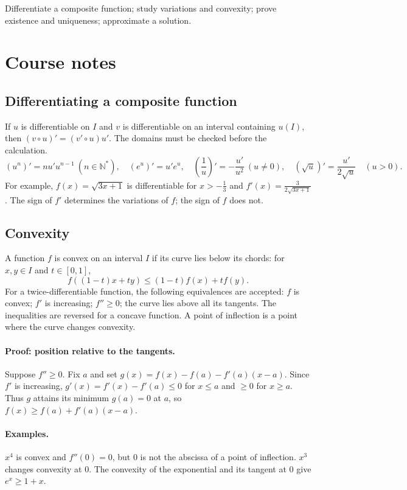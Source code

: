 \label{ch:4}


\begin{keypoint}[Objectives]Differentiate a composite function; study variations and convexity; prove existence and uniqueness; approximate a solution.\end{keypoint}

\section{Course notes}
\subsection{Differentiating a composite function}
If $u$ is differentiable on $I$ and $v$ is differentiable on an interval containing $u(I)$, then $(v\circ u)'=(v'\circ u)u'$. The domains must be checked before the calculation.
\[ (u^n)'=nu'u^{n-1}\ (n\in\mathbb N^*),\quad(e^u)'=u'e^u,\quad
(\frac{1}{u})'=-\frac{u'}{u^2}\ (u\ne0),\quad(\sqrt u)'=\frac{u'}{2\sqrt u}\quad(u>0).\]
For example, $f(x)=\sqrt{3x+1}$ is differentiable for $x>-\frac{1}{3}$ and $f'(x)=\frac{3}{2\sqrt{3x+1}}$. The sign of $f'$ determines the variations of $f$; the sign of $f$ does not.
\subsection{Convexity}
A function $f$ is convex on an interval $I$ if its curve lies below its chords: for $x,y\in I$ and $t\in[0,1]$,
\[f((1-t)x+ty)\le(1-t)f(x)+tf(y).\]
For a twice-differentiable function, the following equivalences are accepted: $f$ is convex; $f'$ is increasing; $f''\ge0$; the curve lies above all its tangents. The inequalities are reversed for a concave function. A point of inflection is a point where the curve changes convexity.
\paragraph{Proof: position relative to the tangents.} Suppose $f''\ge0$. Fix $a$ and set $g(x)=f(x)-f(a)-f'(a)(x-a)$. Since $f'$ is increasing, $g'(x)=f'(x)-f'(a)\le0$ for $x\le a$ and $\ge0$ for $x\ge a$. Thus $g$ attains its minimum $g(a)=0$ at $a$, so $f(x)\ge f(a)+f'(a)(x-a)$.
\paragraph{Examples.} $x^4$ is convex and $f''(0)=0$, but $0$ is not the abscissa of a point of inflection. $x^3$ changes convexity at $0$. The convexity of the exponential and its tangent at $0$ give $e^x\ge1+x$.
